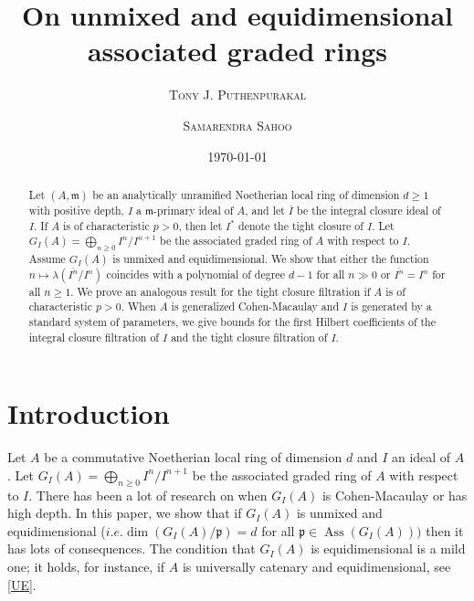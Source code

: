 \documentclass[11pt]{amsart}
\theoremstyle{plain}
\newcommand{\m}{\mathfrak{m}}
\theoremstyle{plain}
\begin{document}
\title{\large \textbf{ On unmixed and equidimensional associated graded rings }}
\author{\textsc{Tony J. Puthenpurakal}}

\author{\textsc{Samarendra Sahoo}}

\address{Department of Mathematics, IIT Bombay, Powai, Mumbai 400 076, India}
\date{\today}




\begin{abstract}
   Let $(A,\m)$ be an analytically unramified  Noetherian local ring of dimension $d \geq 1$ with positive depth, $I$ a $\m$-primary ideal of $A$, and let $\overline{I}$ be the integral closure ideal of $I$. If $A$ is of characteristic $p > 0$, then let $I^*$ denote the tight closure of $I$. Let $G_I(A)=\bigoplus_{n\geq 0}I^n/I^{n+1}$ be the associated graded ring of $A$ with respect to $I$. Assume  $G_I(A)$ is unmixed and equidimensional.  We show that either the function $n\mapsto \lambda(\overline{I^n}/I^n)$ coincides with a polynomial of degree $d-1$ for all $n\gg0$ or $\overline{I^n}=I^n$ for all $n\geq 1.$  We prove an analogous result for the tight closure filtration if $A$ is of characteristic $p > 0$.  When $A$ is generalized Cohen-Macaulay and $I$ is generated by a standard system of parameters, we give bounds for the first Hilbert coefficients of the integral closure filtration of $I$ and the tight closure filtration of $I$.
\end{abstract}
\maketitle


\section{Introduction}
Let $A$ be a commutative Noetherian local ring of dimension $d$ and $I$ an ideal of $A$. Let $G_I(A) = \bigoplus_{n \geq 0} I^n/I^{n+1}$ be the associated graded ring of $A$ with respect to $I$.
There has been a lot of research on when $G_I(A)$ is Cohen-Macaulay or has high depth. In this paper, we show that if $G_I(A)$ is unmixed and equidimensional ($i.e. \operatorname{dim}({G}_I(A)/\mathfrak{p})=d$ for all $\mathfrak{p}\in \operatorname{Ass}({G}_I(A)))$ then it has lots of consequences.
The condition that $G_I(A)$ is equidimensional is a mild one; it holds, for instance, if $A$ is universally catenary and equidimensional, see \ref{UE}.
\end{document}
